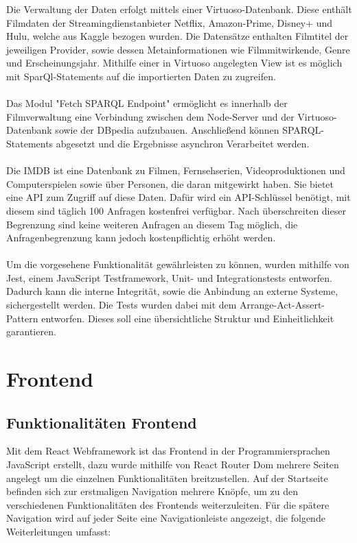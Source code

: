\documentclass[conference]{IEEEtran}
\begin{document}
Die Verwaltung der Daten erfolgt mittels einer Virtuoso-Datenbank. Diese enthält Filmdaten der Streamingdienstanbieter
Netflix, Amazon-Prime, Disney+ und Hulu, welche aus Kaggle bezogen wurden.
Die Datensätze enthalten Filmtitel der jeweiligen Provider, sowie dessen Metainformationen wie 
Filmmitwirkende, Genre und Erscheinungsjahr. Mithilfe einer in Virtuoso angelegten View ist es möglich
mit SparQl-Statements auf die importierten Daten zu zugreifen.
\\
\\
Das Modul "Fetch SPARQL Endpoint" ermöglicht es innerhalb der Filmverwaltung eine Verbindung zwischen dem Node-Server
und der Virtuoso-Datenbank sowie der DBpedia aufzubauen. Anschließend können SPARQL-Statements abgesetzt und die Ergebnisse
asynchron Verarbeitet werden.
\\
\\
Die IMDB ist eine Datenbank zu Filmen, Fernsehserien, Videoproduktionen und Computerspielen sowie über Personen,
die daran mitgewirkt haben. Sie bietet eine API zum Zugriff auf diese Daten. Dafür wird ein API-Schlüssel benötigt, 
mit diesem sind täglich 100 Anfragen kostenfrei verfügbar. Nach überschreiten dieser Begrenzung sind keine weiteren Anfragen
an diesem Tag möglich, die Anfragenbegrenzung kann jedoch kostenpflichtig erhöht werden. 
\\
\\
Um die vorgesehene Funktionalität gewährleisten zu können, wurden mithilfe von Jest, einem JavaScript Testframework, 
Unit- und Integrationstests entworfen. Dadurch kann die interne Integrität, sowie die Anbindung an externe Systeme,
sichergestellt werden. Die Tests wurden dabei mit dem Arrange-Act-Assert-Pattern entworfen. Dieses soll eine 
übersichtliche Struktur und Einheitlichkeit garantieren.

\section{Frontend}

\subsection{Funktionalitäten Frontend}
Mit dem React Webframework ist das Frontend in der Programmiersprachen JavaScript erstellt, 
dazu wurde mithilfe von React Router Dom mehrere Seiten angelegt um die einzelnen Funktionalitäten breitzustellen. 
Auf der Startseite befinden sich zur erstmaligen Navigation mehrere Knöpfe, um zu den verschiedenen Funktionalitäten des Frontends weiterzuleiten.
Für die spätere Navigation wird auf jeder Seite eine Navigationleiste angezeigt, die folgende Weiterleitungen umfasst:
\end{document}
